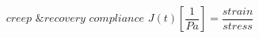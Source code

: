 \documentclass{article}
\begin{document}

$$ \textit{creep \& recovery compliance } J(t) \left[ \frac{1}{Pa} \right] = \frac{\textit{strain}}{\textit{stress}} $$
\end{document}
